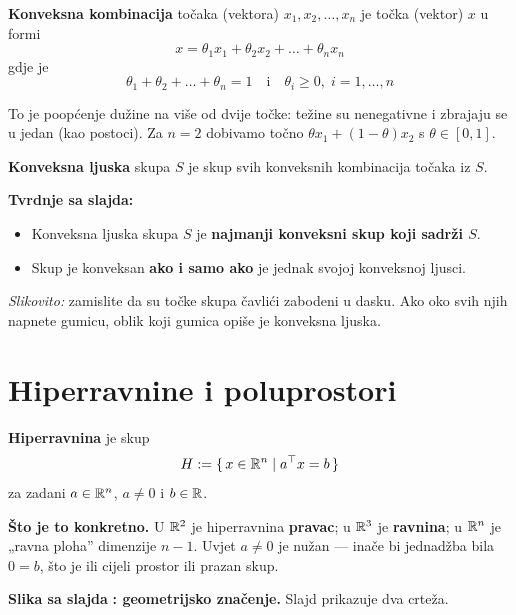 \begin{definicija}
\textbf{Konveksna kombinacija} točaka (vektora) $x_1, x_2, \dots, x_n$ je
točka (vektor) $x$ u formi
\[
x = \theta_1x_1 + \theta_2x_2 + \dots + \theta_nx_n
\]
gdje je
\[
\theta_1 + \theta_2 + \dots + \theta_n = 1 \quad\text{i}\quad
\theta_i \ge 0,\; i = 1,\dots,n
\]
\end{definicija}

To je poopćenje dužine na više od dvije točke: težine su nenegativne i zbrajaju
se u jedan (kao postoci). Za $n = 2$ dobivamo točno $\theta x_1 +
(1-\theta)x_2$ s $\theta \in [0,1]$.

\begin{definicija}
\textbf{Konveksna ljuska} skupa $S$ je skup svih konveksnih kombinacija točaka
iz $S$.
\end{definicija}

\textbf{Tvrdnje sa slajda:}
\begin{itemize}
  \item Konveksna ljuska skupa $S$ je \textbf{najmanji konveksni skup koji
        sadrži $S$}.
  \item Skup je konveksan \textbf{ako i samo ako} je jednak svojoj konveksnoj
        ljusci.
\end{itemize}

\emph{Slikovito:} zamislite da su točke skupa čavlići zabodeni u dasku. Ako
oko svih njih napnete gumicu, oblik koji gumica opiše je konveksna ljuska.

\section{Hiperravnine i poluprostori}
\label{sec:hiperravnine}

\begin{definicija}[Hiperravnina]
\textbf{Hiperravnina} je skup
\[
H := \{\, x \in \mathbb{R}^n \mid a^{\top} x = b \,\}
\]
za zadani $a \in \mathbb{R}^n$, $a \ne 0$ i $b \in \mathbb{R}$.
\end{definicija}

\textbf{Što je to konkretno.} U $\mathbb{R}^2$ je hiperravnina \textbf{pravac}; u
$\mathbb{R}^3$ je \textbf{ravnina}; u $\mathbb{R}^n$ je „ravna ploha” dimenzije $n-1$. Uvjet
$a \ne 0$ je nužan --- inače bi jednadžba bila $0 = b$, što je ili cijeli
prostor ili prazan skup.

\textbf{Slika sa slajda} \textbf{: geometrijsko značenje.} Slajd
prikazuje dva crteža.

